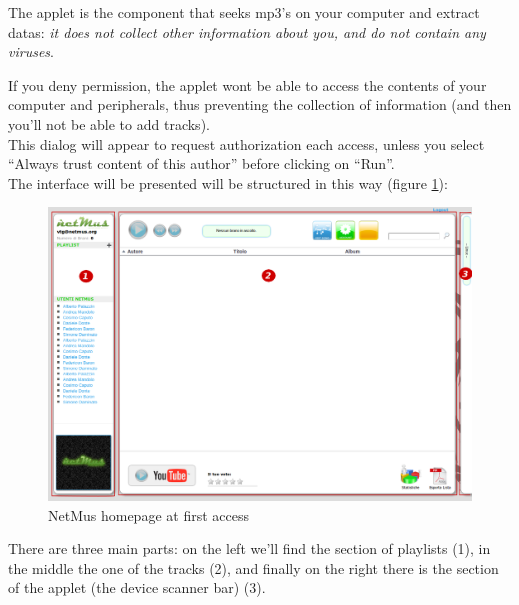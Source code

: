 The applet is the  component that seeks mp3's on your computer and
extract datas: \emph{it does not collect other information about you, and do not
contain any viruses}.

If you deny permission, the applet wont be able to access the contents of your
computer and peripherals, thus preventing the collection of information
(and then you'll not be able to add tracks).\\
This dialog will appear to request authorization each
access, unless you select ``Always trust content of
this author'' before clicking on ``Run''.\\

The interface will be presented will be structured
in this way (figure \ref{fig:paginaPrincipale}): \ \

\begin{figure}[!htbp]
  \centering
  \includegraphics[width=15cm]{img/MU/profile_blank.png}
\caption{NetMus homepage at first access}
\label{fig:paginaPrincipale}
\end{figure}

There are three main parts: on the left we'll find the section of
playlists (1), in the middle the one of the tracks (2), and finally on the right
there is the section of the applet (the device scanner bar) (3).\\

